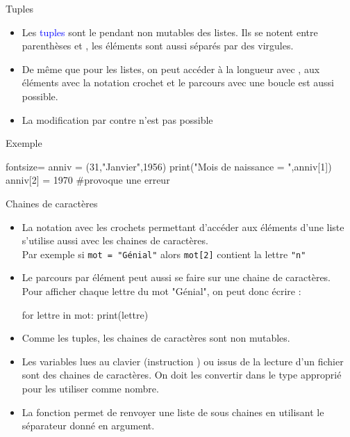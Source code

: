 \documentclass[10pt]{beamer}
\begin{document}
\begin{frame}[fragile]{\Ctitle}{\stitle}
	\begin{alertblock}{Tuples}
		\begin{itemize}
			\item<1-> Les \textcolor{blue}{tuples} sont le pendant non mutables des listes. Ils se notent entre parenthèses \kw{(} et \kw{)}, les éléments sont aussi séparés par des virgules.
			\item<2-> De même que pour les listes, on peut accéder à la longueur avec , aux éléments avec la notation crochet et le parcours avec une boucle  est aussi possible.
			\item<3-> La modification par contre n'est pas possible
		\end{itemize}
	\end{alertblock}
	\begin{exampleblock}{Exemple}
		\begin{codepython*}{fontsize=\small}
			anniv = (31,"Janvier",1956) 
			print("Mois de naissance = ",anniv[1])
			anniv[2] = 1970 #provoque une erreur
		\end{codepython*}
	\end{exampleblock}
\end{frame}

\begin{frame}[fragile]{\Ctitle}{\stitle}
	\begin{alertblock}{Chaines de caractères}
		\begin{itemize}
		\item<1-> La notation avec les crochets permettant d'accéder aux éléments d'une liste s'utilise aussi avec les chaines de caractères. \\
			      \onslide<2-> Par exemple si \texttt{mot = "Génial"} alors \texttt{mot[2]} contient la lettre \texttt{"n"}
		\item<3-> Le parcours par élément peut aussi se faire sur une chaine de caractères. \\
			      \onslide<4-> Pour afficher chaque lettre du mot "Génial", on peut donc écrire :
			      \onslide<5->\begin{codepython}
for lettre in mot:
	print(lettre)
				  \end{codepython}
		\item<6-> Comme les tuples, les chaines de caractères sont non mutables.
		\item<7-> \textcolor{blue}{\small \important} Les variables lues au clavier (instruction ) ou issus de la lecture d'un fichier sont des chaines de caractères. On doit les convertir dans le type approprié pour les utiliser comme nombre.
		\item<8-> La fonction  permet de renvoyer une liste de sous chaines en utilisant le séparateur donné en argument.
		\end{itemize}
	\end{alertblock}
\end{frame}
\end{document}

